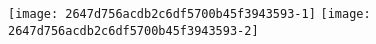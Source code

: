 \texttt{[image: 2647d756acdb2c6df5700b45f3943593-1]}%
\ifx\betweenLilyPondSystem \undefined
  \linebreak
\else
  \expandafter{}%
\fi
\texttt{[image: 2647d756acdb2c6df5700b45f3943593-2]}%
